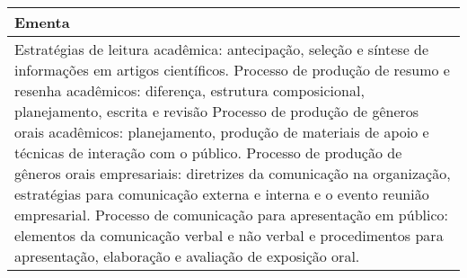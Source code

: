 \begin{quadro}[h!]
\begin{tabular}{|p{3cm} p{2cm} p{3cm} p{2cm} p{3cm} p{2cm}|}
\multicolumn{6}{|p{15cm}|}{\cellcolor{blue1} Ementa} \\\hline
\hline\multicolumn{6}{|p{15cm}|}{\scriptsize Estratégias de leitura acadêmica: antecipação, seleção e síntese de informações em artigos científicos.              Processo de produção de resumo e resenha acadêmicos: diferença, estrutura composicional, planejamento, escrita e revisão Processo de produção de gêneros orais acadêmicos: planejamento, produção de materiais de apoio e técnicas de interação com o público. Processo de produção de gêneros orais empresariais: diretrizes da comunicação na organização, estratégias para comunicação externa e interna e o evento reunião empresarial. Processo de comunicação para apresentação em público: elementos da comunicação verbal e não verbal e procedimentos para apresentação, elaboração e avaliação de exposição oral.}\\\hline
\hline
	\end{tabular}
\end{quadro}
